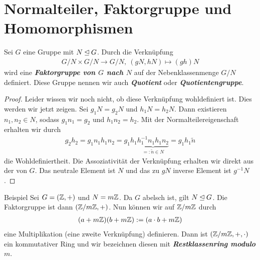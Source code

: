 
\section{Normalteiler, Faktorgruppe und Homomorphismen}

\begin{df}\label{skript:3.1}  
Sei $G$ eine Gruppe mit $N \unlhd G$.
Durch die Verknüpfung
\begin{align*}
G / N \times G / N \to G / N, \ (gN,hN) \mapsto (gh)N
\end{align*}
wird eine \textbf{\textit{Faktorgruppe von $G$ nach $N$}} auf der Nebenklassenmenge $G / N$ 
definiert.
Diese Gruppe nennen wir auch \textbf{\textit{Quotient}} oder \textbf{\textit{Quotientengruppe}}.
\end{df}

\begin{proof}
Leider wissen wir noch nicht, ob diese Verknüpfung wohldefiniert ist. Dies werden wir jetzt zeigen.
Sei $g_1N = g_2 N $ und $h_1N = h_2 N$.
Dann existieren $n_1, n_2 \in N $, sodass $g_1n_1 = g_2$ und $h_1n_2 = h_2$.
Mit der Normalteilereigenschaft erhalten wir durch
\begin{align*}
g_2 h_2 = g_1n_1h_1n_2 = g_1h_1 \underbrace{h_1^{-1}n_1h_1n_2}_{=: \tilde{n }\in N} = g_1h_1\tilde{n} 
\end{align*}
die Wohldefiniertheit. Die Assoziativität der Verknüpfung erhalten wir direkt aus der von $G$.
Das neutrale Element ist $N$ und das zu $gN$ inverse Element ist $g^{-1} N$.
\end{proof}

\begin{genericdf}{Beispiel}\label{skript:3.2} 
Sei $G = (\mathbb{Z},+)$ und $N = m\mathbb{Z}$. Da $G$ abelsch ist, gilt $N \unlhd G$. Die  Faktorgruppe
ist dann $(\mathbb{Z} / m \mathbb{Z},+)$. Nun können wir auf $\mathbb{Z} / m \mathbb{Z}$ durch
\begin{align*}
(a + m\mathbb{Z})(b + m\mathbb{Z}) := (a\cdot b + m\mathbb{Z}) 
\end{align*}
eine Multiplikation (eine zweite Verknüpfung) definieren. 
Dann ist $(\mathbb{Z} / m \mathbb{Z},+, \cdot ) $ ein kommutativer Ring und wir bezeichnen diesen mit 
\textbf{\textit{Restklassenring modulo $m$}}.
\end{genericdf}

